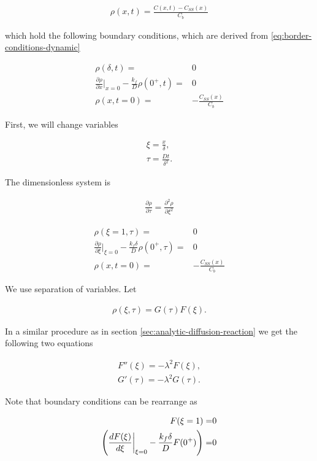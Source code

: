 \begin{align}
	\rho(x, t) = \frac{C(x,t) - C_{SS}(x)}{C_b}
\end{align}


which hold the following boundary conditions, which are derived from \ref{eq:border-conditions-dynamic}



\begin{align}
			\rho(\delta, t) =& 0\\
		\frac{\partial \rho}{\partial x}\big|_{x=0} -\frac{k_f}{D}\rho(0^+,t) =& 0\\
		\rho(x, t=0) =& -\frac{C_{SS}(x)}{C_b}
\end{align}


First, we will change variables

\begin{align}
	\xi = \frac{x}{\delta},\\
	\tau = \frac{D t}{\delta^2}.
\end{align}

The dimensionless system is

\begin{align}
		\frac{\partial \rho}{\partial \tau} = \frac{\partial^2 \rho}{\partial \xi^2}
		\label{eq:dynamic-system}
	\end{align}

\begin{align}
			\rho(\xi = 1, \tau) =& 0\\
		\frac{\partial \rho}{\partial \xi}\big|_{\xi=0} -\frac{k_f\delta}{D}\rho(0^+,\tau) =& 0\\
		\rho(x, t=0) =& -\frac{C_{SS}(x)}{C_b}
\end{align}


We use separation of variables. Let

\begin{align}
	\rho(\xi, \tau) =  G(\tau) F(\xi).
\end{align}

In a similar procedure as in section \ref{sec:analytic-diffusion-reaction} we get the following two equations

\begin{align}
	F''(\xi) = -\lambda^2 F(\xi), 
	\label{eq:F-equation}\\
	G'(\tau) = -\lambda^2 G(\tau).
	\label{eq:G-equation}
\end{align}

Note that boundary conditions can be rearrange as


\begin{align}
			F(\xi=1) =& 0\\
		\left({\frac{d F(\xi)}{d \xi}\bigg|_{\xi=0} -\frac{k_f\delta}{D}F(0^+)}\right) =& 0
\end{align}


